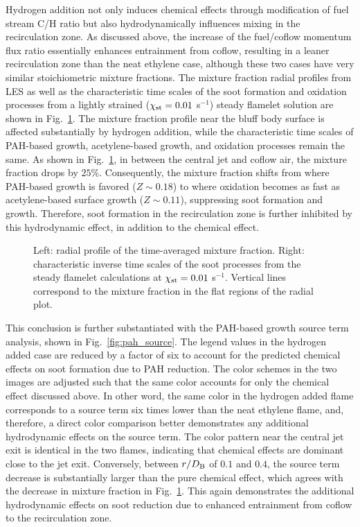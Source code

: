 \documentclass[review,3p,times]{elsarticle}
\begin{document}
Hydrogen addition not only induces chemical effects through modification of fuel stream C/H ratio but also hydrodynamically influences mixing in the recirculation zone.  As discussed above, the increase of the fuel/coflow momentum flux ratio essentially enhances entrainment from coflow, resulting in a leaner recirculation zone than the neat ethylene case, although these two cases have very similar stoichiometric mixture fractions.  The mixture fraction radial profiles from LES as well as the characteristic time scales of the soot formation and oxidation processes from a lightly strained ($\chi_{\rm st} = 0.01$ s$^{-1}$) steady flamelet solution are shown in Fig.~\ref{fig:timescale}.  The mixture fraction profile near the bluff body surface is affected substantially by hydrogen addition, while the characteristic time scales of PAH-based growth, acetylene-based growth, and oxidation processes remain the same.  As shown in Fig.~\ref{fig:timescale}, in between the central jet and coflow air, the mixture fraction drops by $25$\%.  Consequently, the mixture fraction shifts from where PAH-based growth is favored ($Z \sim 0.18$) to where oxidation becomes as fast as acetylene-based surface growth ($Z \sim 0.11$), suppressing soot formation and growth.  Therefore, soot formation in the recirculation zone is further inhibited by this hydrodynamic effect, in addition to the chemical effect.  

\begin{figure}[t]
  \centering
  \scriptsize
  \resizebox{0.49\textwidth}{!}{}
  \resizebox{0.49\textwidth}{!}{}
  \vspace{-0.2in}
  \normalsize
  \caption{Left: radial profile of the time-averaged mixture fraction.  Right: characteristic inverse time scales of the soot processes from the steady flamelet calculations at $\chi_{\rm st} = 0.01$ s$^{-1}$.  Vertical lines correspond to the mixture fraction in the flat regions of the radial plot.}
  \label{fig:timescale}
\end{figure}

This conclusion is further substantiated with the PAH-based growth source term analysis, shown in Fig.~\ref{fig:pah_source}.  The legend values in the hydrogen added case are reduced by a factor of six to account for the predicted chemical effects on soot formation due to PAH reduction.  The color schemes in the two images are adjusted such that the same color accounts for only the chemical effect discussed above.  In other word, the same color in the hydrogen added flame corresponds to a source term six times lower than the neat ethylene flame, and, therefore, a direct color comparison better demonstrates any additional hydrodynamic effects on the source term.  The color pattern near the central jet exit is identical in the two flames, indicating that chemical effects are dominant close to the jet exit.  Conversely, between $r/D_{\rm B}$ of $0.1$ and $0.4$, the source term decrease is substantially larger than the pure chemical effect, which agrees with the decrease in mixture fraction in Fig.~\ref{fig:timescale}.  This again demonstrates the additional hydrodynamic effects on soot reduction due to enhanced entrainment from coflow to the recirculation zone. 
\end{document}
